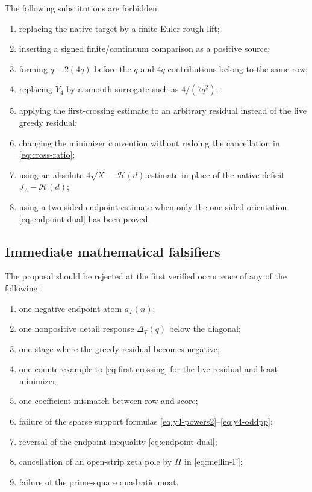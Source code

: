\documentclass[11pt]{article}
\newcommand{\Yfour}{Y_4}
\newcommand{\Jnat}{J_\Lambda}
\newcommand{\Hscore}{\mathcal H}
\begin{document}
The following substitutions are forbidden:
\begin{enumerate}[label=\textbf{F\arabic*.}]
\item replacing the native target by a finite Euler rough lift;
\item inserting a signed finite/continuum comparison as a positive source;
\item forming $q-2(4q)$ before the $q$ and $4q$ contributions belong to the same row;
\item replacing $\Yfour$ by a smooth surrogate such as $4/(7q^2)$;
\item applying the first-crossing estimate to an arbitrary residual instead of the live greedy residual;
\item changing the minimizer convention without redoing the cancellation in \eqref{eq:cross-ratio};
\item using an absolute $4\sqrt X-\Hscore(d)$ estimate in place of the native deficit $\Jnat-\Hscore(d)$;
\item using a two-sided endpoint estimate when only the one-sided orientation \eqref{eq:endpoint-dual} has been proved.
\end{enumerate}

\subsection{Immediate mathematical falsifiers}

The proposal should be rejected at the first verified occurrence of any of the following:
\begin{enumerate}[label=(\roman*)]
\item one negative endpoint atom $a_T(n)$;
\item one nonpositive detail response $\Delta_T(q)$ below the diagonal;
\item one stage where the greedy residual becomes negative;
\item one counterexample to \eqref{eq:first-crossing} for the live residual and least minimizer;
\item one coefficient mismatch between row and score;
\item failure of the sparse support formulas \eqref{eq:y4-powers2}--\eqref{eq:y4-oddpp};
\item reversal of the endpoint inequality \eqref{eq:endpoint-dual};
\item cancellation of an open-strip zeta pole by $\Pi$ in \eqref{eq:mellin-F};
\item failure of the prime-square quadratic moat.
\end{enumerate}
\end{document}
